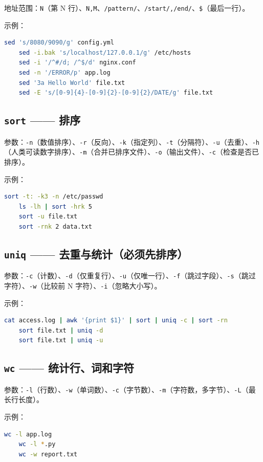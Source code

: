 地址范围：\texttt{N}（第 N 行）、\texttt{N,M}、\texttt{/pattern/}、\texttt{/start/,/end/}、\texttt{\$}（最后一行）。

示例：
\begin{lstlisting}[language=bash]
	sed 's/8080/9090/g' config.yml
	sed -i.bak 's/localhost/127.0.0.1/g' /etc/hosts
	sed -i '/^#/d; /^$/d' nginx.conf
	sed -n '/ERROR/p' app.log
	sed '3a Hello World' file.txt
	sed -E 's/[0-9]{4}-[0-9]{2}-[0-9]{2}/DATE/g' file.txt
\end{lstlisting}

\subsection*{\texttt{sort} —— 排序}
参数：\texttt{-n}（数值排序）、\texttt{-r}（反向）、\texttt{-k}（指定列）、\texttt{-t}（分隔符）、\texttt{-u}（去重）、\texttt{-h}（人类可读数字排序）、\texttt{-m}（合并已排序文件）、\texttt{-o}（输出文件）、\texttt{-c}（检查是否已排序）。

示例：
\begin{lstlisting}[language=bash]
	sort -t: -k3 -n /etc/passwd
	ls -lh | sort -hrk 5
	sort -u file.txt
	sort -rnk 2 data.txt
\end{lstlisting}

\subsection*{\texttt{uniq} —— 去重与统计（必须先排序）} 参数：\texttt{-c}（计数）、\texttt{-d}（仅重复行）、\texttt{-u}（仅唯一行）、\texttt{-f}（跳过字段）、\texttt{-s}（跳过字符）、\texttt{-w}（比较前 N 字符）、\texttt{-i}（忽略大小写）。

示例：
\begin{lstlisting}[language=bash]
	cat access.log | awk '{print $1}' | sort | uniq -c | sort -rn
	sort file.txt | uniq -d
	sort file.txt | uniq -u
\end{lstlisting}

\subsection*{\texttt{wc} —— 统计行、词和字符} 参数：\texttt{-l}（行数）、\texttt{-w}（单词数）、\texttt{-c}（字节数）、\texttt{-m}（字符数，多字节）、\texttt{-L}（最长行长度）。

示例：
\begin{lstlisting}[language=bash]
	wc -l app.log
	wc -l *.py
	wc -w report.txt
\end{lstlisting}

